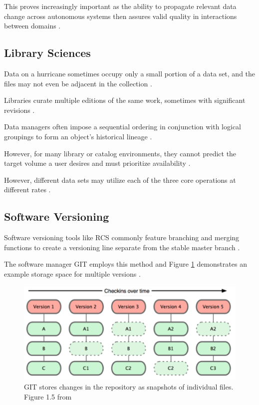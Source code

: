 This proves increasingly important as the ability to propagate relevant data change across autonomous systems then assures valid quality in interactions between domains \cite{Systems02champagne:data}.

\subsection{Library Sciences}

Data on a hurricane sometimes occupy only a small portion of a data set, and the files may not even be adjacent in the collection \cite{Barkstrom_digitallibrary}.

Libraries curate multiple editions of the same work, sometimes with significant revisions \cite{Wiil:2000:RDH:338407.338517}.

Data managers often impose a sequential ordering in conjunction with logical groupings to form an object's historical lineage \cite{barkstrom2014earth}.

However, for many library or catalog environments, they cannot predict the target volume a user desires and must prioritize availability \cite{Payette2002} \cite{Barkstrom_digitallibrary}.

However, different data sets may utilize each of the three core operations at different rates \cite{rohtua}.

\subsection{Software Versioning}

Software versioning tools like RCS commonly feature branching and merging functions to create a versioning line separate from the stable master branch \cite{tichy1985rcs}.

The software manager GIT employs this method and Figure \ref{GITFile} demonstrates an example storage space for multiple versions \cite{Chacon:2009:PG:1618548}.

\begin{figure}
	\centering
	\includegraphics[scale=0.50]{figures/GITFiles.png}
	\caption[GIT stores changes in the repository as snapshots of individual files.]{GIT stores changes in the repository as snapshots of individual files. Figure 1.5 from \cite{Chacon:2009:PG:1618548}}
	\label{GITFile}
\end{figure}

